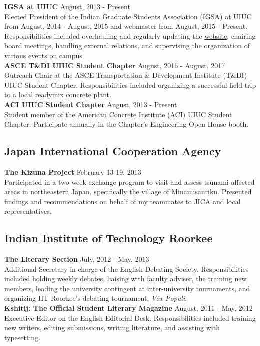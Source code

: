 \documentclass[12pt]{article}
\begin{document}
\textbf{IGSA at UIUC} \hfill August, 2013 - Present \\
Elected President of the Indian Graduate Students Association (IGSA) at UIUC from August, 2014 - August, 2015 and webmaster from August, 2015 - Present. Responsibilities included overhauling and regularly updating the \href{http://igsauiuc.com/?i=1}{website}, chairing board meetings, handling external relations, and supervising the organization of various events on campus. \\

\textbf{ASCE T\&DI UIUC Student Chapter} \hfill August, 2016 - August, 2017 \\
Outreach Chair at the ASCE Transportation \& Development Institute (T\&DI) UIUC Student Chapter. Responsibilities included organizing a successful field trip to a local readymix concrete plant. \\

\textbf{ACI UIUC Student Chapter} \hfill August, 2013 - Present \\
Student member of the American Concrete Institute (ACI) UIUC Student Chapter. Participate annually in the Chapter's Engineering Open House booth. \\

\subsection*{Japan International Cooperation Agency}
\textbf{The Kizuna Project} \hfill February 13-19, 2013\\
Participated in a two-week exchange program to visit and assess tsunami-affected areas in northeastern Japan, specifically the village of Minamisanriku. Presented findings and recommendations on behalf of my teammates to JICA and local representatives. \\

\subsection*{Indian Institute of Technology Roorkee}
\textbf{The Literary Section} \hfill July, 2012 - May, 2013\\
Additional Secretary in-charge of the English Debating Society. Responsibilities included holding weekly debates, liaising with faculty adviser, the training new members, leading the university contingent at inter-university tournaments, and organizing IIT Roorkee's debating tournament, \textit{Vox Populi}. \\

\textbf{Kshitij: The Official Student Literary Magazine} \hfill August, 2011 - May, 2012\\
Executive Editor on the English Editorial Desk. Responsibilities included training new writers, editing submissions, writing literature, and assisting with typesetting. \\
\end{document}
